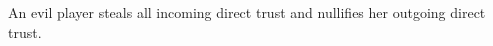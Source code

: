 {}
\begin{definition}
  An evil player steals all incoming direct trust and nullifies her outgoing direct trust.
\end{definition}
